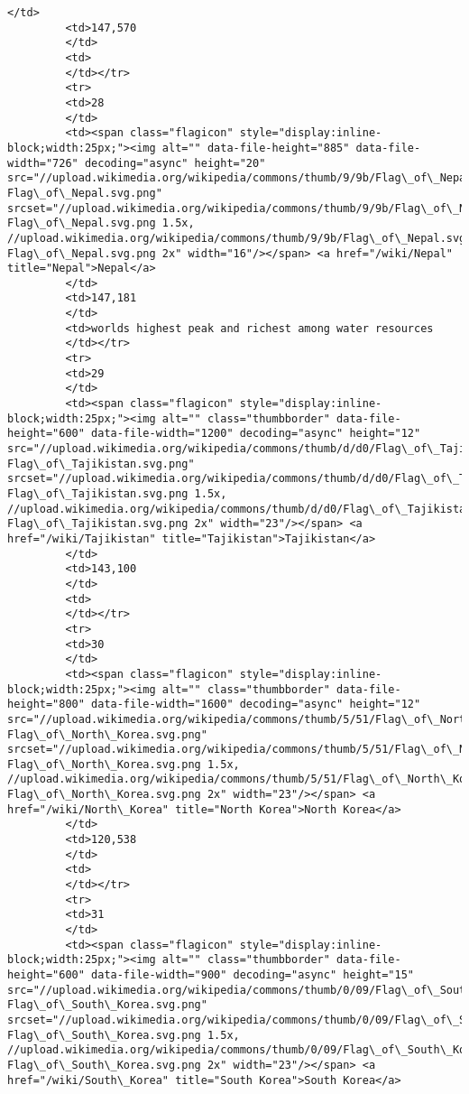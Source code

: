 \documentclass[11pt]{article}
\begin{document}
\begin{Verbatim}[commandchars=\\\{\}]
         </td>
         <td>147,570
         </td>
         <td>
         </td></tr>
         <tr>
         <td>28
         </td>
         <td><span class="flagicon" style="display:inline-block;width:25px;"><img alt="" data-file-height="885" data-file-width="726" decoding="async" height="20" src="//upload.wikimedia.org/wikipedia/commons/thumb/9/9b/Flag\_of\_Nepal.svg/16px-Flag\_of\_Nepal.svg.png" srcset="//upload.wikimedia.org/wikipedia/commons/thumb/9/9b/Flag\_of\_Nepal.svg/25px-Flag\_of\_Nepal.svg.png 1.5x, //upload.wikimedia.org/wikipedia/commons/thumb/9/9b/Flag\_of\_Nepal.svg/33px-Flag\_of\_Nepal.svg.png 2x" width="16"/></span> <a href="/wiki/Nepal" title="Nepal">Nepal</a>
         </td>
         <td>147,181
         </td>
         <td>worlds highest peak and richest among water resources
         </td></tr>
         <tr>
         <td>29
         </td>
         <td><span class="flagicon" style="display:inline-block;width:25px;"><img alt="" class="thumbborder" data-file-height="600" data-file-width="1200" decoding="async" height="12" src="//upload.wikimedia.org/wikipedia/commons/thumb/d/d0/Flag\_of\_Tajikistan.svg/23px-Flag\_of\_Tajikistan.svg.png" srcset="//upload.wikimedia.org/wikipedia/commons/thumb/d/d0/Flag\_of\_Tajikistan.svg/35px-Flag\_of\_Tajikistan.svg.png 1.5x, //upload.wikimedia.org/wikipedia/commons/thumb/d/d0/Flag\_of\_Tajikistan.svg/46px-Flag\_of\_Tajikistan.svg.png 2x" width="23"/></span> <a href="/wiki/Tajikistan" title="Tajikistan">Tajikistan</a>
         </td>
         <td>143,100
         </td>
         <td>
         </td></tr>
         <tr>
         <td>30
         </td>
         <td><span class="flagicon" style="display:inline-block;width:25px;"><img alt="" class="thumbborder" data-file-height="800" data-file-width="1600" decoding="async" height="12" src="//upload.wikimedia.org/wikipedia/commons/thumb/5/51/Flag\_of\_North\_Korea.svg/23px-Flag\_of\_North\_Korea.svg.png" srcset="//upload.wikimedia.org/wikipedia/commons/thumb/5/51/Flag\_of\_North\_Korea.svg/35px-Flag\_of\_North\_Korea.svg.png 1.5x, //upload.wikimedia.org/wikipedia/commons/thumb/5/51/Flag\_of\_North\_Korea.svg/46px-Flag\_of\_North\_Korea.svg.png 2x" width="23"/></span> <a href="/wiki/North\_Korea" title="North Korea">North Korea</a>
         </td>
         <td>120,538
         </td>
         <td>
         </td></tr>
         <tr>
         <td>31
         </td>
         <td><span class="flagicon" style="display:inline-block;width:25px;"><img alt="" class="thumbborder" data-file-height="600" data-file-width="900" decoding="async" height="15" src="//upload.wikimedia.org/wikipedia/commons/thumb/0/09/Flag\_of\_South\_Korea.svg/23px-Flag\_of\_South\_Korea.svg.png" srcset="//upload.wikimedia.org/wikipedia/commons/thumb/0/09/Flag\_of\_South\_Korea.svg/35px-Flag\_of\_South\_Korea.svg.png 1.5x, //upload.wikimedia.org/wikipedia/commons/thumb/0/09/Flag\_of\_South\_Korea.svg/45px-Flag\_of\_South\_Korea.svg.png 2x" width="23"/></span> <a href="/wiki/South\_Korea" title="South Korea">South Korea</a>

\end{Verbatim}
\end{document}
